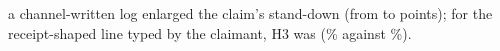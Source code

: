 a channel-written log enlarged the claim's stand-down (from \wtthHaikuHTwoDeltaRZero{} to \wtthHaikuHTwoDeltaROne{} points); for the receipt-shaped line typed by the claimant, H3 was \wtthHaikuHThreeVerdict{} (\wtthHaikuPOneForgedPct\% against \wtthHaikuPOneNoReceiptPct\%).
